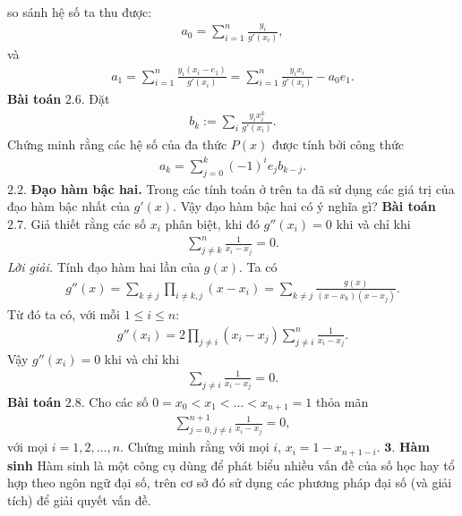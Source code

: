 \begin{multicols}{2}
\begin{align*}
	\end{align*}
	so sánh hệ số ta thu được:
	\begin{align*}
		a_0= \sum_{i=1}^n 
		\frac{ y_i}{g'(x_i)} ,
	\end{align*}
	và 
	\begin{align*}
		a_1= \sum_{i=1}^n
		\frac{y_i (x_i-e_1)}{g'(x_i)}=
		\sum_{i=1}^n \frac{y_i  x_i}{g'(x_i)}-a_0e_1.
	\end{align*}
	\textbf{\color{hoccungpi}Bài toán} $\pmb{2.6.}$
	Đặt
	\begin{align*}
		b_k:=\sum_i\frac{y_i x_i^k}{g'(x_i)}.
	\end{align*}
	Chứng minh rằng các hệ số của đa thức $P(x)$ được tính bởi công thức
	\begin{align*}
		a_k=\sum_{j=0}^k(-1)^i e_jb_{k-j}.
	\end{align*}
	$\pmb{2.2.}$ \textbf{\color{hoccungpi}Đạo hàm bậc hai.} Trong các tính toán ở trên ta đã sử dụng các giá trị của đạo hàm bậc nhất của $g'(x)$. Vậy đạo hàm bậc hai có ý nghĩa gì? 
	\vskip 0.1cm
	\textbf{\color{hoccungpi}Bài toán} $\pmb{2.7.}$ Giả thiết rằng các số $x_i$ phân biệt, khi đó $g''(x_i)=0$ khi và chỉ khi
	\begin{align*}
		  \sum
		_{j\neq k}^n\frac1{x_i-x_j}=0.
	\end{align*}
	\textit{Lời giải.} 
	Tính đạo hàm hai lần của $g(x)$. Ta có
	\begin{align*}
		g''(x)=\sum_{k\neq  j}\prod_{i\neq k,j}(x-x_i)= \sum_{k\neq j}\frac{g(x)}{(x-x_k)(x-x_j)}.
	\end{align*}
	Từ đó ta có, với mỗi $1\leq i\leq n$: 
	\begin{align*}
		g''(x_i)=2\prod_{j\neq i}(x_i-x_j)\sum_{j\neq i}^n\frac1{x_i-x_j}.
	\end{align*}
	Vậy $g''(x_i)=0$ khi và chỉ khi
	\begin{align*}
		\sum_{j\neq i}\frac1{x_i-x_j}=0.
	\end{align*}  
	\textbf{\color{hoccungpi}Bài toán} $\pmb{2.8.}$
	Cho các số $0=x_0<x_1<\ldots<x_{n+1}=1$ thỏa mãn
	\begin{align*}
		\sum_{j=0,j\neq i}^{n+1}\frac1{x_i-x_j}=0,
	\end{align*}
	với mọi $i=1,2,\ldots,n$. Chứng minh rằng với mọi $i$, $x_i=1-x_{n+1-i}$.
	\vskip 0.1cm 
	$\pmb{3.}$ \textbf{\color{hoccungpi}Hàm sinh}
	\vskip 0.1cm
	Hàm sinh là một  công cụ dùng để phát biểu nhiều vấn đề của số học hay tổ hợp theo ngôn ngữ đại số, trên cơ sở đó sử dụng các phương pháp đại số (và giải tích) để giải quyết vấn đề. 
	\vskip 0.1cm

\end{multicols}
